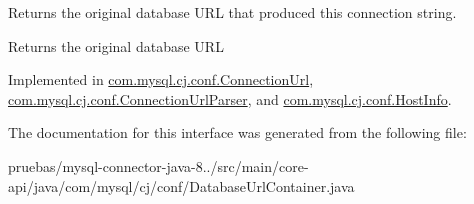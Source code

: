 Returns the original database U\+RL that produced this connection string.

\begin{DoxyReturn}{Returns}
the original database U\+RL 
\end{DoxyReturn}


Implemented in \mbox{\hyperlink{classcom_1_1mysql_1_1cj_1_1conf_1_1_connection_url_a574945f907f1b2aadd0f056e0e240bbf}{com.\+mysql.\+cj.\+conf.\+Connection\+Url}}, \mbox{\hyperlink{classcom_1_1mysql_1_1cj_1_1conf_1_1_connection_url_parser_af08f3c184e60422f883d7400e326e3e1}{com.\+mysql.\+cj.\+conf.\+Connection\+Url\+Parser}}, and \mbox{\hyperlink{classcom_1_1mysql_1_1cj_1_1conf_1_1_host_info_a84c5d1cc48b3d5d1d9911513777f9152}{com.\+mysql.\+cj.\+conf.\+Host\+Info}}.



The documentation for this interface was generated from the following file\+:\begin{DoxyCompactItemize}
\item 
pruebas/mysql-\/connector-\/java-\/8../src/main/core-\/api/java/com/mysql/cj/conf/Database\+Url\+Container.\+java\end{DoxyCompactItemize}
